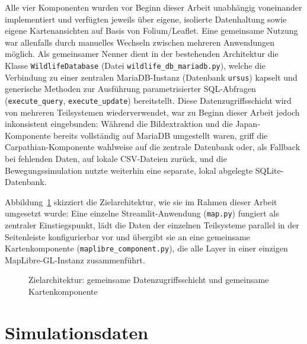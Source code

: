 \documentclass[12pt,a4paper]{report}
\begin{document}
Alle vier Komponenten wurden vor Beginn dieser Arbeit unabhängig voneinander implementiert und verfügten jeweils über eigene, isolierte Datenhaltung sowie eigene Kartenansichten auf Basis von Folium/Leaflet. Eine gemeinsame Nutzung war allenfalls durch manuelles Wechseln zwischen mehreren Anwendungen möglich. Als gemeinsamer Nenner dient in der bestehenden Architektur die Klasse \texttt{WildlifeDatabase} (Datei \texttt{wildlife\_db\_mariadb.py}), welche die Verbindung zu einer zentralen MariaDB-Instanz (Datenbank \texttt{ursus}) kapselt und generische Methoden zur Ausführung parametrisierter SQL-Abfragen (\texttt{execute\_query}, \texttt{execute\_update}) bereitstellt. Diese Datenzugriffsschicht wird von mehreren Teilsystemen wiederverwendet, war zu Beginn dieser Arbeit jedoch inkonsistent eingebunden: Während die Bildextraktion und die Japan-Komponente bereits vollständig auf MariaDB umgestellt waren, griff die Carpathian-Komponente wahlweise auf die zentrale Datenbank oder, als Fallback bei fehlenden Daten, auf lokale CSV-Dateien zurück, und die Bewegungssimulation nutzte weiterhin eine separate, lokal abgelegte SQLite-Datenbank.

Abbildung~\ref{fig:architektur} skizziert die Zielarchitektur, wie sie im Rahmen dieser Arbeit umgesetzt wurde: Eine einzelne Streamlit-Anwendung (\texttt{map.py}) fungiert als zentraler Einstiegspunkt, lädt die Daten der einzelnen Teilsysteme parallel in der Seitenleiste konfigurierbar vor und übergibt sie an eine gemeinsame Kartenkomponente (\texttt{maplibre\_component.py}), die alle Layer in einer einzigen MapLibre-GL-Instanz zusammenführt.

\begin{figure}[h!]
\centering
\caption{Zielarchitektur: gemeinsame Datenzugriffsschicht und gemeinsame Kartenkomponente}
\label{fig:architektur}
\end{figure}

\section{Simulationsdaten}
\end{document}
